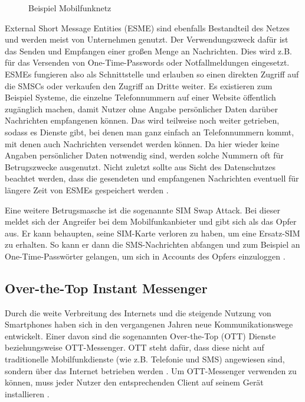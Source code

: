\documentclass[conference]{IEEEtran}
\begin{document}
\begin{figure}
    \centerline{}
    \caption{Beispiel Mobilfunknetz \cite{sendoutsms}}
    \label{mobilfunknetz}
\end{figure}

External Short Message Entities (ESME) sind ebenfalls Bestandteil des Netzes und werden meist von Unternehmen genutzt.
Der Verwendungszweck dafür ist das Senden und Empfangen einer großen Menge an Nachrichten.
Dies wird z.B. für das Versenden von One-Time-Passwords oder Notfallmeldungen eingesetzt.
ESMEs fungieren also als Schnittstelle und erlauben so einen direkten Zugriff auf die SMSCs oder verkaufen den Zugriff an Dritte weiter.
Es existieren zum Beispiel Systeme, die einzelne Telefonnummern auf einer Website öffentlich zugänglich machen, damit Nutzer ohne Angabe persönlicher Daten darüber Nachrichten empfangenen können.
Das wird teilweise noch weiter getrieben, sodass es Dienste gibt, bei denen man ganz einfach an Telefonnummern kommt, mit denen auch Nachrichten versendet werden können.
Da hier wieder keine Angaben persönlicher Daten notwendig sind, werden solche Nummern oft für Betrugszwecke ausgenutzt.
Nicht zuletzt sollte aus Sicht des Datenschutzes beachtet werden, dass die gesendeten und empfangenen Nachrichten eventuell für längere Zeit von ESMEs gespeichert werden \cite{sendoutsms}.

Eine weitere Betrugsmasche ist die sogenannte SIM Swap Attack.
Bei dieser meldet sich der Angreifer bei dem Mobilfunkanbieter und gibt sich als das Opfer aus.
Er kann behaupten, seine SIM-Karte verloren zu haben, um eine Ersatz-SIM zu erhalten.
So kann er dann die SMS-Nachrichten abfangen und zum Beispiel an One-Time-Passwörter gelangen, um sich in Accounts des Opfers einzuloggen \cite{sendoutsms}.


\subsection{Over-the-Top Instant Messenger}

Durch die weite Verbreitung des Internets und die steigende Nutzung von Smartphones haben sich in den vergangenen Jahren neue Kommunikationswege entwickelt.
Einer davon sind die sogenannten Over-the-Top (OTT) Dienste beziehungsweise OTT-Messenger.
OTT steht dafür, dass diese nicht auf traditionelle Mobilfunkdienste (wie z.B. Telefonie und SMS) angewiesen sind, sondern über das Internet betrieben werden \cite{ottbund}.
Um OTT-Messenger verwenden zu können, muss jeder Nutzer den entsprechenden Client auf seinem Gerät installieren \cite{rcsmno}.
\end{document}
